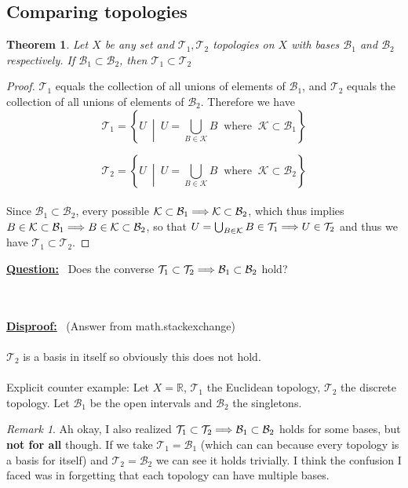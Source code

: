 \documentclass{article}
\newtheorem{theorem}{Theorem}[section]
\theoremstyle{remark}
\newtheorem*{remark}{Remark}
\theoremstyle{definition}
\newcommand{\simplies}{\DOTSB\Longrightarrow}
\begin{document}
\subsection{Comparing topologies}

\bigskip

\begin{theorem}
Let $X$ be any set and $\mathcal{T}_1, \mathcal{T}_2$ topologies on $X$ with bases $\mathcal{B}_1$ and $\mathcal{B}_2$ respectively. If $\mathcal{B}_1 \subset \mathcal{B}_2$, then $\mathcal{T}_1 \subset \mathcal{T}_2$
\end{theorem}

\begin{proof}
$\mathcal{T}_1$ equals the collection of all unions of elements of $\mathcal{B}_1$, and $\mathcal{T}_2$ equals the collection of all unions of elements of $\mathcal{B}_2$. Therefore we have
 $$\mathcal{T}_1 = \left\{U \ \middle| \ U = \bigcup_{B \in \mathcal{K}}B \ \text{ where } \ \mathcal{K} \subset \mathcal{B}_1\right\}$$

$$\mathcal{T}_2 = \left\{U \ \middle| \ U = \bigcup_{B \in \mathcal{K}}B \ \text{ where } \ \mathcal{K} \subset \mathcal{B}_2\right\}$$
\\
Since $\mathcal{B}_1 \subset \mathcal{B}_2$, every possible $\mathcal{K} \subset \mathcal{B}_1 \simplies \mathcal{K} \subset \mathcal{B}_2$, which thus implies $B \in \mathcal{K} \subset \mathcal{B}_1 \simplies B \in\mathcal{K} \subset \mathcal{B}_2$, so that $U = \bigcup_{B \in \mathcal{K}}B \in \mathcal{T}_1 \simplies U \in \mathcal{T}_2$ and thus we have $\mathcal{T}_1 \subset \mathcal{T}_2$.
\end{proof}

\smallskip \begin{flushleft}
\textbf{\underline{Question:}} \ Does the converse $\mathcal{T}_1 \subset \mathcal{T}_2 \simplies \mathcal{B}_1 \subset \mathcal{B}_2$ hold?
\end{flushleft}
\\ \\
\textbf{\underline{Disproof:}} \ (Answer from math.stackexchange)\ \\ \\ $\mathcal{T}_2$ is a basis in itself so obviously this does not hold.
\\ \\
Explicit counter example: Let $X = \mathbb R$, $\mathcal{T}_1$ the Euclidean topology, $\mathcal{T}_2$ the discrete topology. Let $\mathcal{B}_1$ be the open intervals and $\mathcal B_2$ the singletons.
\medskip
\begin{remark}
Ah okay, I also realized $\mathcal{T}_1 \subset \mathcal{T}_2 \simplies \mathcal{B}_1 \subset \mathcal{B}_2$ holds for some bases, but \textbf{not for all} though. If we take $\mathcal{T}_1 = \mathcal{B}_1$ (which can can because every topology is a basis for itself) and $\mathcal{T}_2 = \mathcal{B}_2$ we can see it holds trivially. I think the confusion I faced was in forgetting that each topology can have multiple bases. 
\end{remark}
\end{document}
